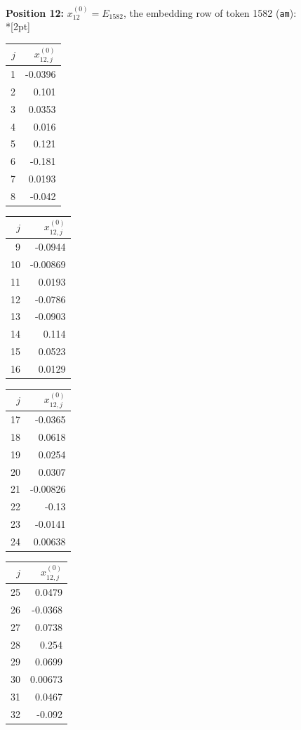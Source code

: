 \noindent \textbf{Position 12:} $x^{(0)}_{12} = E_{1582}$, the embedding row of token 1582 (\texttt{\textvisiblespace{}am}):\\*[2pt]
{\tablefont \begin{tabular}[t]{r|r}
$j$ & $x^{(0)}_{12,j}$ \\\hline
1 & -0.0396 \\
2 & 0.101 \\
3 & 0.0353 \\
4 & 0.016 \\
5 & 0.121 \\
6 & -0.181 \\
7 & 0.0193 \\
8 & -0.042
\end{tabular}\kern4pt
\begin{tabular}[t]{r|r}
$j$ & $x^{(0)}_{12,j}$ \\\hline
9 & -0.0944 \\
10 & -0.00869 \\
11 & 0.0193 \\
12 & -0.0786 \\
13 & -0.0903 \\
14 & 0.114 \\
15 & 0.0523 \\
16 & 0.0129
\end{tabular}\kern4pt
\begin{tabular}[t]{r|r}
$j$ & $x^{(0)}_{12,j}$ \\\hline
17 & -0.0365 \\
18 & 0.0618 \\
19 & 0.0254 \\
20 & 0.0307 \\
21 & -0.00826 \\
22 & -0.13 \\
23 & -0.0141 \\
24 & 0.00638
\end{tabular}\kern4pt
\begin{tabular}[t]{r|r}
$j$ & $x^{(0)}_{12,j}$ \\\hline
25 & 0.0479 \\
26 & -0.0368 \\
27 & 0.0738 \\
28 & 0.254 \\
29 & 0.0699 \\
30 & 0.00673 \\
31 & 0.0467 \\
32 & -0.092
\end{tabular}\kern4pt
\begin{tabular}[t]{r|r}

\end{tabular}}
